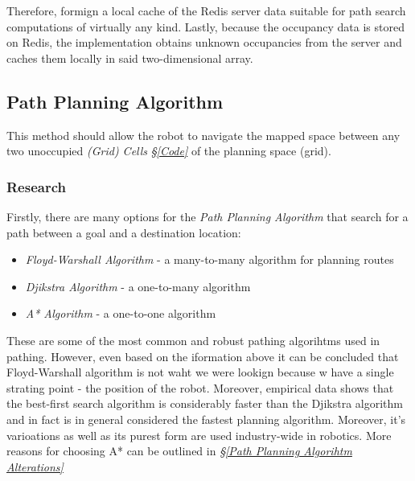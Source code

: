 \documentclass[11pt, a4paper]{article}
\begin{document}
Therefore, formign a local cache of the Redis server data suitable for path search computations of virtually any kind. Lastly, because the occupancy data is stored on Redis, the implementation obtains unknown occupancies from the server and caches them locally in said two-dimensional array. 




\subsection{Path Planning Algorithm}
\label{Path Planning Algorithm}

This method should allow the robot to navigate the mapped space between any two unoccupied \textit{(Grid) Cells} \textit{\S\ref{Code}} of the planning space (grid). 

\subsubsection{Research}

Firstly, there are many options for the \textit{Path Planning Algorithm} that search for a path between a goal and a destination location:

\begin{itemize}

	\item \textit{Floyd-Warshall Algorithm}\cite{path_warshall} - a many-to-many algorithm for planning routes
	\item \textit{Djikstra Algorithm}\cite{path_warshall} - a one-to-many algorithm
	\item \textit{A* Algorithm}\cite{path_astar}	- a one-to-one algorithm

\end{itemize}

These are some of the most common and robust pathing algorihtms used in pathing. However, even based on the iformation above it can be concluded that Floyd-Warshall algorithm is not waht we were lookign because w have a single strating point - the position of the robot. Moreover, empirical data\cite{path_efficiency} shows that the best-first search algorithm is considerably faster than the Djikstra algorithm and in fact is in general considered the fastest planning algorithm. Moreover, it's varioations as well as its purest form are used industry-wide in robotics. More reasons for choosing A* can be outlined in \textit{\S\ref{Path Planning Algorihtm Alterations}}
\end{document}
